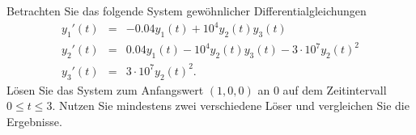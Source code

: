 \begin{aufg}[0]
Betrachten Sie das folgende System gew\"ohnlicher Differentialgleichungen
\begin{eqnarray*}
y_1'(t) & = & - 0.04 y_1(t) + 10^4 y_2(t)y_3(t) \\
y_2'(t) & = & 0.04 y_1(t) - 10^4 y_2(t) y_3(t) - 3 \cdot 10^7 y_2(t)^2\\
y_3'(t) & = & 3 \cdot 10^7 y_2(t)^2.
\end{eqnarray*}
L\"osen Sie  das System zum Anfangswert $(1,0,0)$ an $0$ auf dem Zeitintervall $0 \leq
t \leq 3$. Nutzen Sie mindestens zwei verschiedene Löser  und vergleichen Sie die Ergebnisse.
\end{aufg}
